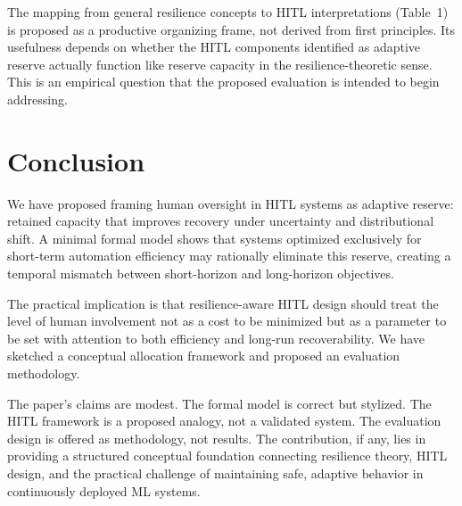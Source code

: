 \documentclass[11pt,a4paper]{article}
\theoremstyle{definition}
\theoremstyle{plain}
\theoremstyle{remark}
\begin{document}
The mapping from general resilience concepts to HITL interpretations (Table~1) is proposed as a productive organizing frame, not derived from first principles. Its usefulness depends on whether the HITL components identified as adaptive reserve actually function like reserve capacity in the resilience-theoretic sense. This is an empirical question that the proposed evaluation is intended to begin addressing.

\section{Conclusion}

We have proposed framing human oversight in HITL systems as adaptive reserve: retained capacity that improves recovery under uncertainty and distributional shift. A minimal formal model shows that systems optimized exclusively for short-term automation efficiency may rationally eliminate this reserve, creating a temporal mismatch between short-horizon and long-horizon objectives.

The practical implication is that resilience-aware HITL design should treat the level of human involvement not as a cost to be minimized but as a parameter to be set with attention to both efficiency and long-run recoverability. We have sketched a conceptual allocation framework and proposed an evaluation methodology.

The paper's claims are modest. The formal model is correct but stylized. The HITL framework is a proposed analogy, not a validated system. The evaluation design is offered as methodology, not results. The contribution, if any, lies in providing a structured conceptual foundation connecting resilience theory, HITL design, and the practical challenge of maintaining safe, adaptive behavior in continuously deployed ML systems.

\newpage

\end{document}
